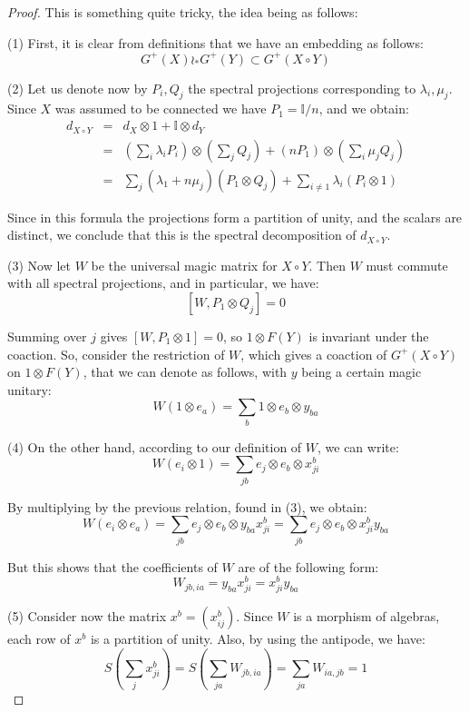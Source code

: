 \documentclass[12pt]{amsbook}
\begin{document}
\begin{proof}
This is something quite tricky, the idea being as follows:

\medskip

(1) First, it is clear from definitions that we have an embedding as follows:
$$G^+(X)\wr_*G^+(Y)\subset G^+(X\circ Y)$$

(2) Let us denote now by $P_i,Q_j$ the spectral projections corresponding to $\lambda_i,\mu_j$. Since $X$ was assumed to be connected we have $P_1=\mathbb I/n$, and we obtain:
\begin{eqnarray*}
d_{X\circ Y}
&=&d_X\otimes 1+{\mathbb I}\otimes d_Y\\
&=&\left(\sum_i\lambda_iP_i\right)\otimes\left(\sum_jQ_j\right)+\left(nP_1\right)\otimes \left(\sum_i\mu_jQ_j\right)\\
&=&\sum_j(\lambda_1+n\mu_j)(P_1\otimes Q_j) + \sum_{i\not=1}\lambda_i(P_i\otimes 1)
\end{eqnarray*} 

Since in this formula the projections form a partition of unity, and the scalars are distinct, we conclude that this is the spectral decomposition of $d_{X\circ Y}$. 

\medskip

(3) Now let $W$ be the universal magic matrix for $X\circ Y$. Then $W$ must commute with all spectral projections, and in particular, we have:
$$[W,P_1\otimes Q_j]=0$$

Summing over $j$ gives $[W,P_1\otimes 1]=0$, so $1\otimes F(Y)$ is invariant under the coaction. So, consider the restriction of $W$, which gives a coaction of $G^+(X\circ Y)$ on $1\otimes F(Y)$, that we can denote as follows, with $y$ being a certain magic unitary:
$$W(1\otimes e_a)=\sum_b1\otimes e_b\otimes y_{ba}$$

(4) On the other hand, according to our definition of $W$, we can write:
$$W(e_i\otimes 1)=\sum_{jb}e_j\otimes e_b\otimes x_{ji}^b$$  

By multiplying by the previous relation, found in (3), we obtain:
$$W(e_i\otimes e_a)
=\sum_{jb}e_j\otimes e_b\otimes y_{ba}x_{ji}^b
=\sum_{jb}e_j \otimes e_b\otimes x_{ji}^by_{ba}$$

But this shows that the coefficients of $W$ are of the following form:
$$W_{jb,ia}=y_{ba}x_{ji}^b=x_{ji}^b y_{ba}$$

(5) Consider now the matrix $x^b=(x_{ij}^b)$. Since $W$ is a morphism of algebras, each row of $x^b$ is a partition of unity. Also, by using the antipode, we have:
$$S\left(\sum_jx_{ji}^{b}\right)
=S\left(\sum_{ja}W_{jb,ia}\right)
=\sum_{ja}W_{ia,jb}
=1$$


\end{proof}
\end{document}
